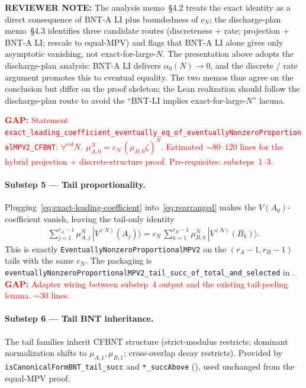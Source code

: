 \documentclass{article}
\newcommand{\leanid}[1]{\texttt{#1}}
\newcommand{\gap}[1]{\textcolor{red}{\textbf{GAP:} #1}}
\theoremstyle{plain}
\begin{document}
\textbf{REVIEWER NOTE:} The analysis memo~\S4.2 treats the exact
identity as a direct consequence of BNT-A LI plus boundedness of $c_N$;
the discharge-plan memo~\S4.3 identifies three candidate routes
(discreteness + rate; projection + BNT-A LI; rescale to equal-MPV) and
flags that BNT-A LI alone gives only asymptotic vanishing, not
exact-for-large-$N$. The presentation above adopts the discharge-plan
analysis: BNT-A LI delivers $\alpha_0(N) \to 0$, and the discrete /
rate argument promotes this to eventual equality. The two memos thus
agree on the conclusion but differ on the proof skeleton; the Lean
realization should follow the discharge-plan route to avoid the
``BNT-LI implies exact-for-large-$N$'' lacuna.

\gap{Statement
    \leanid{exact\_leading\_coefficient\_eventually\_eq\_of\_eventuallyNonzeroProportionalMPV2\_CFBNT}:
    $\forall^{\mathrm{cof}} N,\ \mu_{A,0}^N = c_N\,(\mu_{B,0}\zeta)^N$.
    Estimated $\sim 80$--$120$ lines for the hybrid projection +
    discrete-structure proof. Pre-requisites: substeps~1--3.}

\paragraph{Substep 5 --- Tail proportionality.}
Plugging~\eqref{eq:exact-leading-coefficient} into~\eqref{eq:rearranged}
makes the $V(A_0)$-coefficient vanish, leaving the tail-only identity
\begin{align}
    \sum_{j=1}^{r_A-1} \mu_{A,j}^N\,|V^{(N)}(A_j)\rangle
    = c_N\,\sum_{k=1}^{r_B-1} \mu_{B,k}^N\,|V^{(N)}(B_k)\rangle.
    \label{eq:tail-proportional}
\end{align}
This is exactly
\leanid{EventuallyNonzeroProportionalMPV2} on the $(r_A-1, r_B-1)$
tails with the same $c_N$. The packaging is
\leanid{eventuallyNonzeroProportionalMPV2\_tail\_succ\_of\_total\_and\_selected}
in .
\gap{Adapter wiring between substep~4 output and the existing
    tail-peeling lemma. $\sim 30$ lines.}

\paragraph{Substep 6 --- Tail BNT inheritance.}
The tail families inherit CFBNT structure (strict-modulus restricts;
dominant normalization shifts to $\mu_{A,1}, \mu_{B,1}$; cross-overlap
decay restricts). Provided by
\leanid{isCanonicalFormBNT\_tail\_succ} and \leanid{*\_succAbove}
(), used unchanged from
the equal-MPV proof.
\end{document}
